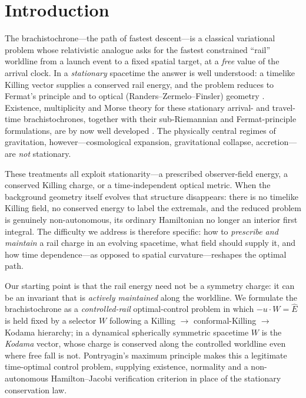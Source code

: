 \documentclass[12pt]{iopart}
\newcommand{\Ehat}{\hat E}
\begin{document}
\section{Introduction}
\label{sec:intro}
The brachistochrone---the path of fastest descent---is a classical variational problem
whose relativistic analogue asks for the fastest constrained ``rail'' worldline from a
launch event to a fixed spatial target, at a \emph{free} value of the arrival clock. In a
\emph{stationary} spacetime the answer is well understood: a timelike Killing vector
supplies a conserved rail energy, and the problem reduces to Fermat's principle and to
optical (Randers--Zermelo--Finsler) geometry
\cite{Perlick1991,PerlickRayOptics,Kovner1990,Randers1941,GibbonsWerner2008,GibbonsRanders2009,BaoRoblesShen}.
Existence, multiplicity and Morse theory for these stationary arrival- and travel-time
brachistochrones, together with their sub-Riemannian and Fermat-principle formulations,
are by now well developed
\cite{GiannoniPiccioneVerderesi1997,GiannoniPiccioneTausk2002,GiannoniPiccione2002,CaponioJavaloyes2026}.
The physically central regimes of gravitation, however---cosmological expansion,
gravitational collapse, accretion---are \emph{not} stationary.

These treatments all exploit stationarity---a prescribed observer-field energy, a
conserved Killing charge, or a time-independent optical metric. When the background
geometry itself evolves that structure disappears: there is no timelike Killing field, no
conserved energy to label the extremals, and the reduced problem is genuinely
non-autonomous, its ordinary Hamiltonian no longer an interior first integral. The
difficulty we address is therefore specific: how to \emph{prescribe and maintain} a rail
charge in an evolving spacetime, what field should supply it, and how time
dependence---as opposed to spatial curvature---reshapes the optimal path.

Our starting point is that the rail energy need not be a symmetry charge: it can be an
invariant that is \emph{actively maintained} along the worldline. We formulate the
brachistochrone as a \emph{controlled-rail} optimal-control problem in which
$-u\cdot W=\Ehat$ is held fixed by a selector $W$ following a Killing $\to$
conformal-Killing $\to$ Kodama hierarchy; in a dynamical spherically symmetric spacetime
$W$ is the \emph{Kodama} vector, whose charge is conserved along the controlled worldline
even where free fall is not. Pontryagin's maximum principle makes this a legitimate
time-optimal control problem, supplying existence, normality and a non-autonomous
Hamilton--Jacobi verification criterion in place of the stationary conservation law.
\end{document}
